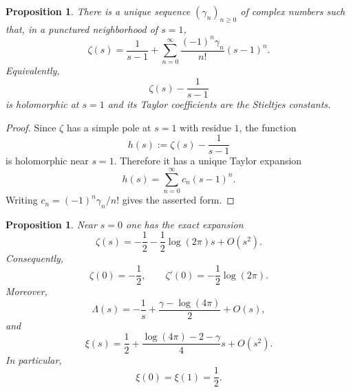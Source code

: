 \documentclass[11pt,a4paper]{article}
\newtheorem{proposition}[theorem]{Proposition}
\theoremstyle{definition}
\theoremstyle{remark}
\begin{document}
\begin{proposition}\label{prop:stieltjes-expansion}
There is a unique sequence $(\gamma_n)_{n\ge 0}$ of complex numbers such that, in a punctured neighborhood of $s=1$,
\begin{equation}\label{eq:stieltjes-expansion}
\zeta(s)=\frac{1}{s-1}+\sum_{n=0}^{\infty}\frac{(-1)^n\gamma_n}{n!}(s-1)^n.
\end{equation}
Equivalently,
\[
\zeta(s)-\frac{1}{s-1}
\]
is holomorphic at $s=1$ and its Taylor coefficients are the Stieltjes constants.
\end{proposition}

\begin{proof}
Since $\zeta$ has a simple pole at $s=1$ with residue $1$, the function
\[
h(s):=\zeta(s)-\frac{1}{s-1}
\]
is holomorphic near $s=1$.  Therefore it has a unique Taylor expansion
\[
h(s)=\sum_{n=0}^{\infty} c_n(s-1)^n.
\]
Writing $c_n=(-1)^n\gamma_n/n!$ gives the asserted form.
\end{proof}

\begin{proposition}\label{prop:zeta-at-zero}
Near $s=0$ one has the exact expansion
\begin{equation}\label{eq:zeta-zero-expansion}
\zeta(s)=-\frac12-\frac12\log(2\pi)s+O(s^2).
\end{equation}
Consequently,
\[
\zeta(0)=-\frac12,
\qquad
\zeta'(0)=-\frac12\log(2\pi).
\]
Moreover,
\begin{equation}\label{eq:Lambda-zero-expansion}
\Lambda(s)=-\frac1s+\frac{\gamma-\log(4\pi)}{2}+O(s),
\end{equation}
and
\begin{equation}\label{eq:xi-zero-expansion}
\xi(s)=\frac12+\frac{\log(4\pi)-2-\gamma}{4}s+O(s^2).
\end{equation}
In particular,
\[
\xi(0)=\xi(1)=\frac12.
\]
\end{proposition}
\end{document}
